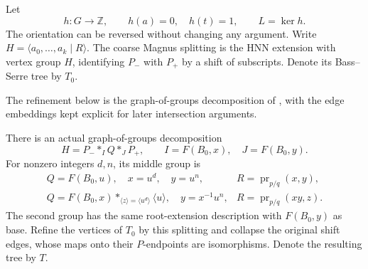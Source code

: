 Let
\[
 h:G\longrightarrow\mathbb Z,\qquad h(a)=0,\quad h(t)=1,\qquad L=\ker h.
\]
The orientation can be reversed without changing any argument.
Write \(H=\langle a_0,\ldots,a_k\mid R\rangle\).
The coarse Magnus splitting is the HNN extension with vertex group
\(H\), identifying \(P_-\) with \(P_+\) by a shift of subscripts.
Denote its Bass--Serre tree by \(T_0\).

The refinement below is the graph-of-groups decomposition of
\cite[Corollaries~3.10--3.11 and Section~5]{LintonHyperbolic2026},
with the edge embeddings kept explicit for later intersection arguments.

\begin{lemma}[Refinement]\label{row:refinement}
There is an actual graph-of-groups decomposition
\begin{equation}\label{row:three-piece}
 H=P_-*_{I}Q*_{J}P_+,\qquad I=F(B_0,x),\quad J=F(B_0,y).
\end{equation}
For nonzero integers \(d,n\), its middle group is
\[
 \begin{array}{ll}
 Q=F(B_0,u),\quad x=u^d,\quad y=u^n,
   &R=\operatorname{pr}_{p/q}(x,y),\\[1mm]
 Q=F(B_0,x)*_{\langle z\rangle=\langle u^d\rangle}\langle u\rangle,
 \quad y=x^{-1}u^n,
   &R=\operatorname{pr}_{p/q}(xy,z).
 \end{array}
\]
The second group has the same root-extension description with
\(F(B_0,y)\) as base. Refine the vertices of \(T_0\) by this splitting
and collapse the original shift edges, whose maps onto their
\(P\)-endpoints are isomorphisms. Denote the resulting tree by \(T\).
\end{lemma}

